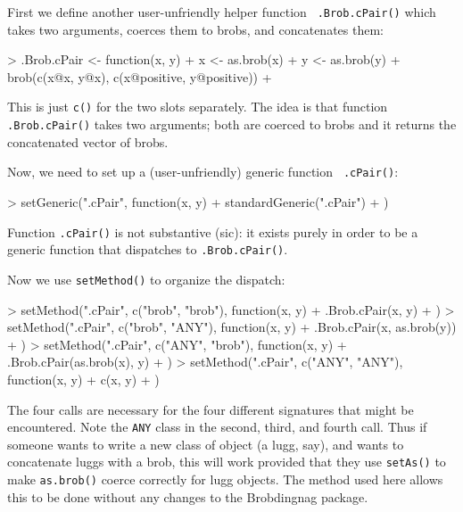 \documentclass[a4paper]{article}
\begin{document}
First we define another user-unfriendly helper function {\tt
.Brob.cPair()} which takes two arguments, coerces them to brobs, and
concatenates them:

\begin{Schunk}
\begin{Sinput}
> .Brob.cPair <- function(x, y) {
+     x <- as.brob(x)
+     y <- as.brob(y)
+     brob(c(x@x, y@x), c(x@positive, y@positive))
+ }
\end{Sinput}
\end{Schunk}

This is just {\tt c()} for the two slots separately.  The idea is that
function {\tt .Brob.cPair()} takes two arguments; both are coerced to
brobs and it returns the concatenated vector of brobs.

Now, we need to set up a (user-unfriendly) generic function {\tt
.cPair()}:

\begin{Schunk}
\begin{Sinput}
> setGeneric(".cPair", function(x, y) {
+     standardGeneric(".cPair")
+ })
\end{Sinput}
\end{Schunk}

Function {\tt .cPair()} is not substantive (sic): it exists purely in
order to be a generic function that dispatches to {\tt .Brob.cPair()}.

Now we use {\tt setMethod()} to organize the dispatch:


\begin{Schunk}
\begin{Sinput}
> setMethod(".cPair", c("brob", "brob"), function(x, y) {
+     .Brob.cPair(x, y)
+ })
> setMethod(".cPair", c("brob", "ANY"), function(x, y) {
+     .Brob.cPair(x, as.brob(y))
+ })
> setMethod(".cPair", c("ANY", "brob"), function(x, y) {
+     .Brob.cPair(as.brob(x), y)
+ })
> setMethod(".cPair", c("ANY", "ANY"), function(x, y) {
+     c(x, y)
+ })
\end{Sinput}
\end{Schunk}


The four calls are necessary for the four different signatures that
might be encountered.  Note the {\tt ANY} class in the second, third,
and fourth call.  Thus if someone wants to write a new class of object
(a lugg, say), and wants to concatenate luggs with a brob, this will
work provided that they use {\tt setAs()} to make {\tt as.brob()}
coerce correctly for lugg objects.  The method used here allows this
to be done without any changes to the Brobdingnag package.
\end{document}
